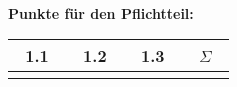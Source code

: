 \documentclass{article}
\begin{document}
\newcommand{\datumf}{
	\begin{Large}
		\datum\-\\
	\end{Large}
}

\fancyhead{}
\fancyfoot{}



\thispagestyle{empty}
\begin{center}
	\fach
	\vspace{1.5cm}
	\gruppe
	\vspace{1.5cm}
	\memberOfGroup{\memOneName}{\memOneMail}{\memOneNr}
	\memberOfGroup{\memTwoName}{\memTwoMail}{\memTwoNr}
	\memberOfGroup{\memThreeName}{\memThreeMail}{\memThreeNr}
	\memberOfGroup{\memFourName}{\memFourMail}{\memFourNr}
	\memberOfGroup{\memFiveName}{\memFiveMail}{\memFiveNr}
	\vspace{1cm}
	\datumf
	\vspace{1cm}
	
	\textbf{Punkte für den Pflichtteil:}\\
	\vspace{1cm}
	\begin{tabular}{c|c|c|c}
	~1.1~&~1.2~&~1.3~&~$\Sigma$~	\\	\hline
		 &	   &	 &
	\end{tabular}
	
\end{center}
\newpage

\pagestyle{fancy}	%
\lhead{\memOneName \\ \memTwoName}	%
\chead{\memThreeName \\}			%
\lfoot{\today}
\rfoot{\thepage}
\end{document}
